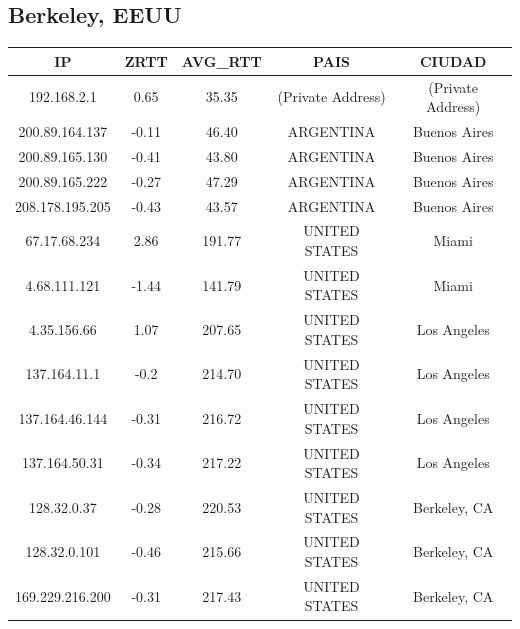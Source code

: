 \subsection{Berkeley, EEUU}

\begin{tabular}{|c@{\hspace{5ex}}c@{\hspace{5ex}}c@{\hspace{5ex}}c@{\hspace{5ex}}c|}
 \hline
 \rule{0pt}{1.2em}IP & ZRTT & AVG\_RTT & PAIS & CIUDAD\\[0.2em]
 \hline

\rule{0pt}{1.2em} 192.168.2.1  &  0.65 & 35.35 & (Private Address) & (Private Address) \\[0.2em]
\rule{0pt}{1.2em} 200.89.164.137  &  -0.11 & 46.40 & ARGENTINA & Buenos Aires \\[0.2em]
\rule{0pt}{1.2em} 200.89.165.130  &  -0.41 & 43.80 & ARGENTINA & Buenos Aires \\[0.2em]
\rule{0pt}{1.2em} 200.89.165.222  &  -0.27 & 47.29 & ARGENTINA & Buenos Aires \\[0.2em]
\rule{0pt}{1.2em} 208.178.195.205  &  -0.43 & 43.57 & ARGENTINA & Buenos Aires \\[0.2em]
\rule{0pt}{1.2em} 67.17.68.234  &  2.86 & 191.77 & UNITED STATES & Miami \\[0.2em]
\rule{0pt}{1.2em} 4.68.111.121  &  -1.44 & 141.79 & UNITED STATES & Miami \\[0.2em]
\rule{0pt}{1.2em} 4.35.156.66  &  1.07 & 207.65 & UNITED STATES & Los Angeles \\[0.2em]
\rule{0pt}{1.2em} 137.164.11.1  &  -0.2& 214.70 & UNITED STATES & Los Angeles \\[0.2em]
\rule{0pt}{1.2em} 137.164.46.144  &  -0.31 & 216.72 & UNITED STATES & Los Angeles \\[0.2em]
\rule{0pt}{1.2em} 137.164.50.31  &  -0.34 & 217.22 & UNITED STATES & Los Angeles \\[0.2em]
\rule{0pt}{1.2em} 128.32.0.37  &  -0.28 & 220.53 & UNITED STATES & Berkeley, CA \\[0.2em]
\rule{0pt}{1.2em} 128.32.0.101  &  -0.46 & 215.66 & UNITED STATES & Berkeley, CA \\[0.2em]
\rule{0pt}{1.2em} 169.229.216.200  &  -0.31 & 217.43 & UNITED STATES & Berkeley, CA \\[0.2em]
\hline
 \end{tabular}

\vspace{20pt}


